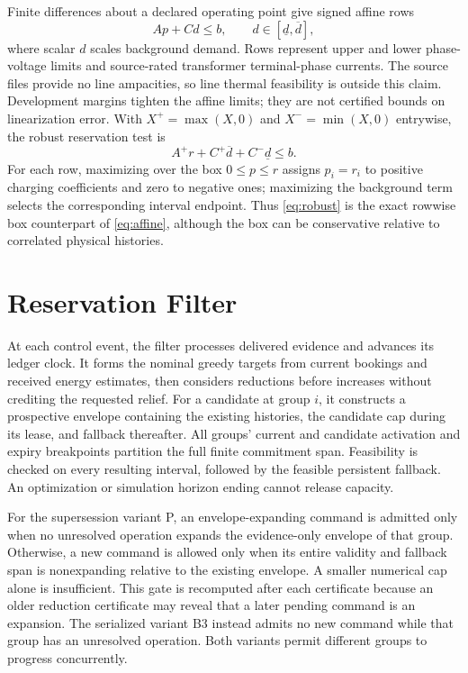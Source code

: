 Finite differences about a declared operating point give signed affine rows
\begin{equation}
 A p+C d\le b,\qquad d\in[\underline d,\overline d],
 \label{eq:affine}
\end{equation}
where scalar $d$ scales background demand. Rows represent upper and lower
phase-voltage limits and source-rated transformer terminal-phase currents. The
source files provide no line ampacities, so line thermal feasibility is outside
this claim. Development margins tighten the affine limits; they are not certified
bounds on linearization error. With $X^+=\max(X,0)$ and $X^-=\min(X,0)$ entrywise,
the robust reservation test is
\begin{equation}
 A^+r+C^+\overline d+C^-\underline d\le b.
 \label{eq:robust}
\end{equation}
For each row, maximizing over the box $0\le p\le r$ assigns $p_i=r_i$ to
positive charging coefficients and zero to negative ones; maximizing the
background term selects the corresponding interval endpoint. Thus
\eqref{eq:robust} is the exact rowwise box counterpart of \eqref{eq:affine},
although the box can be conservative relative to correlated physical histories.

\section{Reservation Filter}
\label{sec:filter}
At each control event, the filter processes delivered evidence and advances its
ledger clock. It forms the nominal greedy targets from current bookings and
received energy estimates, then considers reductions before increases without
crediting the requested relief. For a candidate at group $i$, it constructs a
prospective envelope containing the existing histories, the candidate cap during
its lease, and fallback thereafter. All groups' current and candidate activation
and expiry breakpoints partition the full finite commitment span. Feasibility is
checked on every resulting interval, followed by the feasible persistent
fallback. An optimization or simulation horizon ending cannot release capacity.

For the supersession variant P, an envelope-expanding command is admitted only
when no unresolved operation
expands the evidence-only envelope of that group. Otherwise, a new command is
allowed only when its entire
validity and fallback span is nonexpanding relative to the existing envelope.
A smaller numerical cap alone is insufficient. This gate is recomputed after
each certificate because an older reduction certificate may reveal that a later
pending command is an expansion. The serialized variant B3 instead admits no
new command while that group has an unresolved operation. Both variants permit
different groups to progress concurrently.

